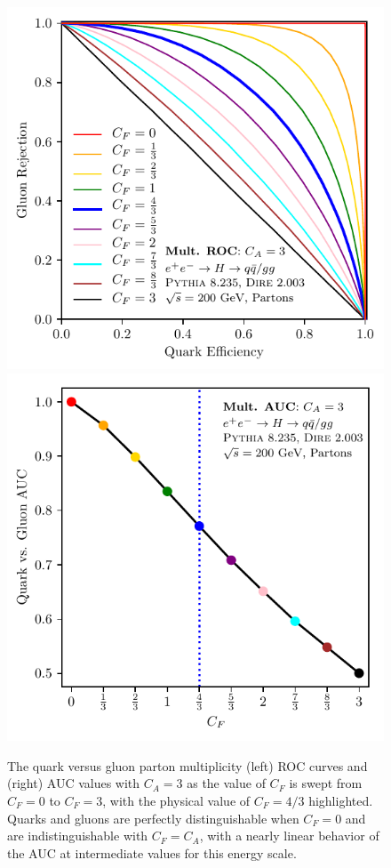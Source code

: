 \documentclass[letterpaper,11pt]{article}
\begin{document}
\begin{figure}[t]
\centering
\includegraphics[scale=0.75]{figures/multroc.pdf}
\includegraphics[scale=0.75]{figures/multauc.pdf}
\caption{\label{fig:multrocauc}
The quark versus gluon parton multiplicity (left) ROC curves and (right) AUC values with $C_A=3$ as the value of $C_F$ is swept from $C_F=0$ to $C_F=3$, with the physical value of $C_F=4/3$ highlighted.
%
Quarks and gluons are perfectly distinguishable when $C_F=0$ and are indistinguishable with $C_F=C_A$, with a nearly linear behavior of the AUC at intermediate values for this energy scale.
}
\end{figure}
\end{document}
